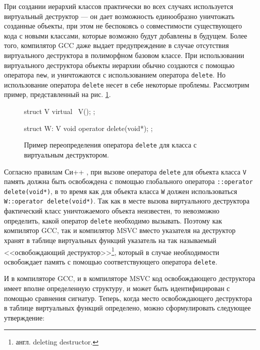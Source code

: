 При создании иерархий классов практически во всех случаях используется виртуальный деструктор --- он дает возможность единообразно уничтожать созданные объекты, при этом не беспокоясь о совместимости существующего кода с новыми классами, которые возможно будут добавлены в будущем. Более того, компилятор GCC даже выдает предупреждение в случае отсутствия виртуального деструктора в полиморфном базовом классе. При использовании виртуального деструктора объекты иерархии обычно создаются с помощью оператора \lstinline{new}, и уничтожаются с использованием оператора \lstinline{delete}. Но использование оператора \lstinline{delete} несет в себе некоторые проблемы. Рассмотрим пример, представленный на рис. \ref{listing:operator_delete}.

\begin{figure}[htb!]
\hspace{2cm}
\begin{minipage}[b]{1cm}
\begin{cplusplus}
struct V {
    virtual ~V();
};

struct W: V {
    void operator delete(void*);
};
\end{cplusplus}
\end{minipage}
\caption{Пример переопределения оператора \lstinline{delete} для класса с виртуальным деструктором.}
\label{listing:operator_delete}
\end{figure}

Согласно правилам Си++ \cite{cpp03}, при вызове оператора \lstinline{delete} для объекта класса \lstinline{V} память должна быть освобождена с помощью глобального оператора \lstinline{::operator delete(void*)}, в то время как для объекта класса \lstinline{W} должен использоваться \lstinline{W::operator delete(void*)}. Так как в месте вызова виртуального деструктора фактический класс уничтожаемого объекта неизвестен, то невозможно определить, какой оператор \lstinline{delete} необходимо вызывать. Поэтому как компилятор GCC, так и компилятор MSVC вместо указателя на деструктор хранят в таблице виртуальных функций указатель на так называемый <<освобождающий деструктор>>\footnote{англ. deleting destructor.}, который в случае необходимости освобождает память с помощью соответствующего оператора \lstinline{delete}.

И в компиляторе GCC, и в компиляторе MSVC код освобождающего деструктора имеет вполне определенную структуру, и может быть идентифицирован с помощью сравнения сигнатур. Теперь, когда место освобождающего деструктора в таблице виртуальных функций определено, можно сформулировать следующее утверждение:

